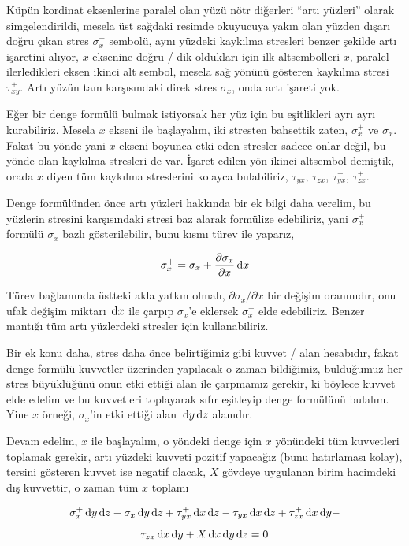 \documentclass[12pt,fleqn]{article}\usepackage{../../common}
\begin{document}
Küpün kordinat eksenlerine paralel olan yüzü nötr diğerleri ``artı yüzleri''
olarak simgelendirildi, mesela üst sağdaki resimde okuyucuya yakın olan yüzden
dışarı doğru çıkan stres $\sigma_x^+$ sembolü, aynı yüzdeki kaykılma stresleri
benzer şekilde artı işaretini alıyor, $x$ eksenine doğru / dik oldukları için
ilk altsembolleri $x$, paralel ilerledikleri eksen ikinci alt sembol, mesela sağ
yönünü gösteren kaykılma stresi $\tau_{xy}^+$. Artı yüzün tam karşısındaki direk
stres $\sigma_x$, onda artı işareti yok.

Eğer bir denge formülü bulmak istiyorsak her yüz için bu eşitlikleri ayrı ayrı
kurabiliriz. Mesela $x$ ekseni ile başlayalım, iki stresten bahsettik zaten,
$\sigma_x^+$ ve $\sigma_x$. Fakat bu yönde yani $x$ ekseni boyunca etki eden
stresler sadece onlar değil, bu yönde olan kaykılma stresleri de var. İşaret
edilen yön ikinci altsembol demiştik, orada $x$ diyen tüm kaykılma streslerini
kolayca bulabiliriz, $\tau_{yx}$, $\tau_{zx}$, $\tau_{yx}^+$, $\tau_{zx}^+$.

Denge formülünden önce artı yüzleri hakkında bir ek bilgi daha verelim, bu
yüzlerin stresini karşısındaki stresi baz alarak formülize edebiliriz,
yani $\sigma_x^+$ formülü $\sigma_x$ bazlı gösterilebilir, bunu kısmı türev
ile yaparız, 

$$
\sigma_x^+ = \sigma_x + \frac{\partial \sigma_x}{\partial x} \,\mathrm{d} x
$$

Türev bağlamında üstteki akla yatkın olmalı, $\partial \sigma_x / \partial x$
bir değişim oranınıdır, onu ufak değişim miktarı $\,\mathrm{d} x$ ile çarpıp
$\sigma_x$'e eklersek $\sigma_x^+$ elde edebiliriz. Benzer mantığı tüm artı
yüzlerdeki stresler için kullanabiliriz.

Bir ek konu daha, stres daha önce belirtiğimiz gibi kuvvet / alan hesabıdır,
fakat denge formülü kuvvetler üzerinden yapılacak o zaman bildiğimiz, bulduğumuz
her stres büyüklüğünü onun etki ettiği alan ile çarpmamız gerekir, ki böylece
kuvvet elde edelim ve bu kuvvetleri toplayarak sıfır eşitleyip denge formülünü
bulalım. Yine $x$ örneği, $\sigma_x$'in etki ettiği alan $\,\mathrm{d} y \,\mathrm{d} z$ alanıdır.

Devam edelim, $x$ ile başlayalım, o yöndeki denge için $x$ yönündeki tüm
kuvvetleri toplamak gerekir, artı yüzdeki kuvveti pozitif yapacağız (bunu
hatırlaması kolay), tersini gösteren kuvvet ise negatif olacak, $X$ gövdeye
uygulanan birim hacimdeki dış kuvvettir, o zaman tüm $x$ toplamı

$$
  \sigma_x^+ \,\mathrm{d} y \,\mathrm{d} z - \sigma_x \,\mathrm{d} y \,\mathrm{d} z +
  \tau_{yx}^+ \,\mathrm{d} x \,\mathrm{d} z - \tau_{yx} \,\mathrm{d} x \,\mathrm{d} z +
  \tau_{zx}^+ \,\mathrm{d} x \,\mathrm{d} y - 
$$
$$
  \tau_{zx} \,\mathrm{d} x \,\mathrm{d} y +   X \,\mathrm{d} x \,\mathrm{d} y \,\mathrm{d} z = 0
$$
\end{document}
